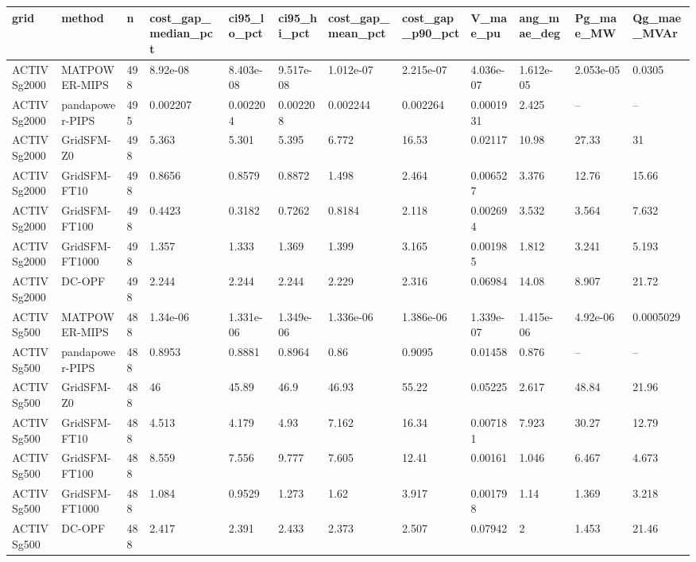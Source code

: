 \begin{tabular}{llllllllllll}
\hline
grid & method & n & cost\_gap\_median\_pct & ci95\_lo\_pct & ci95\_hi\_pct & cost\_gap\_mean\_pct & cost\_gap\_p90\_pct & V\_mae\_pu & ang\_mae\_deg & Pg\_mae\_MW & Qg\_mae\_MVAr \\
\hline
ACTIVSg2000 & MATPOWER-MIPS & 498 & 8.92e-08 & 8.403e-08 & 9.517e-08 & 1.012e-07 & 2.215e-07 & 4.036e-07 & 1.612e-05 & 2.053e-05 & 0.0305 \\
ACTIVSg2000 & pandapower-PIPS & 495 & 0.002207 & 0.002204 & 0.002208 & 0.002244 & 0.002264 & 0.0001931 & 2.425 & -- & -- \\
ACTIVSg2000 & GridSFM-Z0 & 498 & 5.363 & 5.301 & 5.395 & 6.772 & 16.53 & 0.02117 & 10.98 & 27.33 & 31 \\
ACTIVSg2000 & GridSFM-FT10 & 498 & 0.8656 & 0.8579 & 0.8872 & 1.498 & 2.464 & 0.006527 & 3.376 & 12.76 & 15.66 \\
ACTIVSg2000 & GridSFM-FT100 & 498 & 0.4423 & 0.3182 & 0.7262 & 0.8184 & 2.118 & 0.002694 & 3.532 & 3.564 & 7.632 \\
ACTIVSg2000 & GridSFM-FT1000 & 498 & 1.357 & 1.333 & 1.369 & 1.399 & 3.165 & 0.001985 & 1.812 & 3.241 & 5.193 \\
ACTIVSg2000 & DC-OPF & 498 & 2.244 & 2.244 & 2.244 & 2.229 & 2.316 & 0.06984 & 14.08 & 8.907 & 21.72 \\
ACTIVSg500 & MATPOWER-MIPS & 488 & 1.34e-06 & 1.331e-06 & 1.349e-06 & 1.336e-06 & 1.386e-06 & 1.339e-07 & 1.415e-06 & 4.92e-06 & 0.0005029 \\
ACTIVSg500 & pandapower-PIPS & 488 & 0.8953 & 0.8881 & 0.8964 & 0.86 & 0.9095 & 0.01458 & 0.876 & -- & -- \\
ACTIVSg500 & GridSFM-Z0 & 488 & 46 & 45.89 & 46.9 & 46.93 & 55.22 & 0.05225 & 2.617 & 48.84 & 21.96 \\
ACTIVSg500 & GridSFM-FT10 & 488 & 4.513 & 4.179 & 4.93 & 7.162 & 16.34 & 0.007181 & 7.923 & 30.27 & 12.79 \\
ACTIVSg500 & GridSFM-FT100 & 488 & 8.559 & 7.556 & 9.777 & 7.605 & 12.41 & 0.00161 & 1.046 & 6.467 & 4.673 \\
ACTIVSg500 & GridSFM-FT1000 & 488 & 1.084 & 0.9529 & 1.273 & 1.62 & 3.917 & 0.001798 & 1.14 & 1.369 & 3.218 \\
ACTIVSg500 & DC-OPF & 488 & 2.417 & 2.391 & 2.433 & 2.373 & 2.507 & 0.07942 & 2 & 1.453 & 21.46 \\
\hline
\end{tabular}
